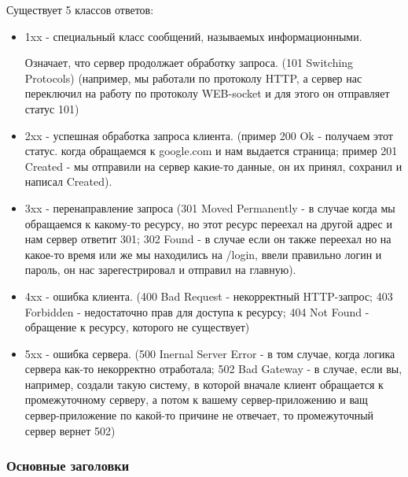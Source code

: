 \documentclass[a4paper,12pt]{article}
\begin{document}
	Существует 5 классов ответов:
	\begin{itemize}
		\item 1xx - специальный класс сообщений, называемых информационными.
		
		Означает, что сервер продолжает обработку запроса. (101 Switching Protocols) (например, мы работали по протоколу HTTP, а сервер нас переключил на работу по протоколу WEB-socket и для этого он отправляет статус 101)
		\item 2xx - успешная обработка запроса клиента. (пример 200 Ok - получаем этот статус. когда обращаемся к google.com и нам выдается страница; пример 201 Created - мы отправили на сервер какие-то данные, он их принял, сохранил и написал Created).
		\item 3xx - перенаправление запроса (301 Moved Permanently - в случае когда мы обращаемся к какому-то ресурсу, но этот ресурс переехал на другой адрес и нам сервер ответит 301; 302 Found - в случае если он также переехал но на какое-то время или же мы находились на /login, ввели правильно логин и пароль, он нас зарегестрировал и отправил на главную).
		\item 4xx - ошибка клиента. (400 Bad Request - некорректный HTTP-запрос; 403 Forbidden - недостаточно прав для доступа к ресурсу; 404 Not Found - обращение к ресурсу, которого не существует)
		\item 5xx - ошибка сервера. (500 Inernal Server Error - в том случае, когда логика сервера как-то некорректно отработала; 502 Bad Gateway - в случае, если вы, например, создали такую систему, в которой вначале клиент обращается к промежуточному серверу, а потом к вашему сервер-приложению и ващ сервер-приложение по какой-то причине не отвечает, то промежуточный сервер вернет 502)
	\end{itemize}

	\subsubsection{Основные заголовки}
\end{document}

